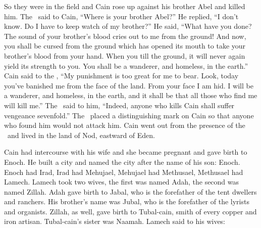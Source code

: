 \begin{inparaenum}
  So they were in the field and Cain rose up against his brother Abel and killed him.%
   The \lord\ said to Cain, ``Where is your brother Abel?'' He replied, ``I don't know. Do I have to keep watch of my brother?''%
   He said, ``What have you done? The sound of your brother's blood cries out to me from the ground!%
   And now, you shall be cursed from the ground which has opened its mouth to take your brother's blood from your hand.%
   When you till the ground, it will never again yield its strength to you. You shall be a wanderer, and homeless, in the earth.''%
   Cain said to the \lord, ``My punishment is too great for me to bear.%
   Look, today you've banished me from the face of the land. From your face I am hid. I will be a wanderer, and homeless, in the earth, and it shall be that all those who find me will kill me.''%
   The \lord\ said to him, ``Indeed, anyone who kills Cain shall suffer vengeance sevenfold.'' The \lord\ placed a distinguishing mark on Cain so that anyone who found him would not attack him.%
   Cain went out from the presence of the \lord\ and lived in the land of Nod, eastward of Eden.%
  
   Cain had intercourse with his wife and she became pregnant and gave birth to Enoch. He built a city and named the city after the name of his son: Enoch.%
   Enoch had Irad, Irad had Mehujael, Mehujael had Methusael, Methusael had Lamech.%
   Lamech took two wives, the first was named Adah, the second was named Zillah.%
   Adah gave birth to Jabal, who is the forefather of the tent dwellers and ranchers.%
   His brother's name was Jubal, who is the forefather of the lyrists and organists.%
   Zillah, as well, gave birth to Tubal-cain, smith of every copper and iron artisan. Tubal-cain's sister was Naamah.%
   Lamech said to his wives:\smallskip%
  

\end{inparaenum}
